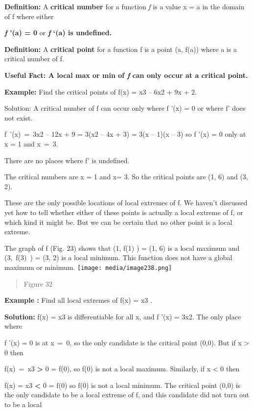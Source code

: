 \textbf{Definition:} A \textbf{critical number} for a function \emph{f}
is a value x = a in the domain of f where either

\textbf{\emph{f} '(a) = 0} or \textbf{\emph{f} `(a) is undefined.}

\textbf{Definition:} A \textbf{critical point} for a function f is a
point (a, f(a)) where a is a critical number of f.

\textbf{Useful Fact: A local max or min of \emph{f} can only occur at a
critical point.}

\textbf{Example:} Find the critical points of f(x) = x3 -- 6x2 + 9x + 2.

Solution: A critical number of f can occur only where f '(x) = 0 or
where f' does not exist.

f~'(x)~=~3x2 -- 12x + 9 = 3(x2 -- 4x + 3) = 3(x -- 1)(x -- 3) so f '(x)
= 0 only at x = 1 and x~=~3.

There are no places where f' is undefined.

The critical numbers are x = 1 and x= 3. So the critical points are (1,
6) and (3, 2).

These are the only possible locations of local extremes of f. We haven't
discussed yet how to tell whether either of these points is actually a
local extreme of f, or which kind it might be. But we can be certain
that no other point is a local extreme.

The graph of f (Fig. 23) shows that (1, f(1) ) = (1, 6) is a local
maximum and (3,~f(3)~) = (3, 2) is a local minimum. This function does
not have a global maximum or minimum.
\texttt{[image: media/image238.png]}

\begin{quote}
Figure 32
\end{quote}

\textbf{Example :} Find all local extremes of f(x) = x3 .

\textbf{Solution:} f(x) = x3 is differentiable for all x, and f '(x) =
3x2. The only place where

f '(x) = 0 is at x~=~0, so the only candidate is the critical point
(0,0). But if x \textgreater{} 0 then

f(x)~=~x3 \textbf{\textgreater{}} 0 = f(0), so f(0) is not a local
maximum. Similarly, if x \textless{} 0 then

f(x) = x3 \textbf{\textless{}} 0 = f(0) so f(0) is not a local minimum.
The critical point (0,0) is the only candidate to be a local extreme of
f, and this candidate did not turn out to be a local

